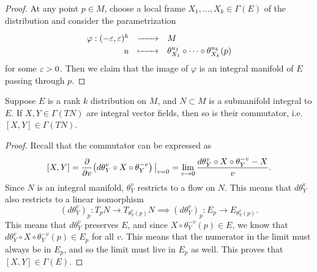\documentclass{lkx_paper}
\begin{document}
\begin{proof}
	At any point $p\in M$, choose a local frame $X_1,\ldots, X_k\in \Gamma(E)$ of the distribution and consider the parametrization
	\[
		\definefunction{\varphi}{(-\eps, \eps)^k}{M}{u}{\theta_{X_1}^{u_1}\circ \cdots \circ \theta_{X_k}^{u_k}(p)}
	\]
	for some $\varepsilon>0$. Then we claim that the image of $\varphi$ is an integral manifold of $E$ passing through $p$.

\end{proof}

\begin{proposition*}
	Suppose $E$ is a rank $k$ distribution on $M$, and $N\subset M$ is a submanifold integral to $E$. If $X,Y\in \Gamma(TN)$ are integral vector fields, then so is their commutator, i.e. $[X,Y]\in \Gamma(TN)$.
\end{proposition*}

\begin{proof}
	Recall that the commutator can be expressed as
	\[
		[X,Y]=\frac{\partial}{\partial v}\restr{\left(d\theta^v_Y \circ X \circ \theta^{-v}_Y\right)}{v=0}=\lim_{v\to 0}\frac{d\theta^v_Y \circ X \circ \theta^{-v}_Y - X}{v}.
	\]
	Since $N$ is an integral manifold, $\theta^v_Y$ restricts to a flow on $N$. This means that $d\theta^v_Y$ also restricts to a linear isomorphism
	\[
		(d\theta^v_Y)_p : T_p N \to T_{\theta^v_Y(p)} N \implies (d\theta^v_Y)_p : E_p \to E_{\theta^v_Y(p)}.
	\]
	This means that $d\theta^v_Y$ preserves $E$, and since $X\circ \theta^{-v}_Y(p)\in E$, we know that $d\theta^v_Y\circ X \circ \theta^{-v}_Y(p)\in E_p$ for all $v$. This means that the numerator in the limit must always be in $E_p$, and so the limit must live in $E_p$ as well. This proves that $[X,Y]\in \Gamma(E)$.
\end{proof}
\end{document}
